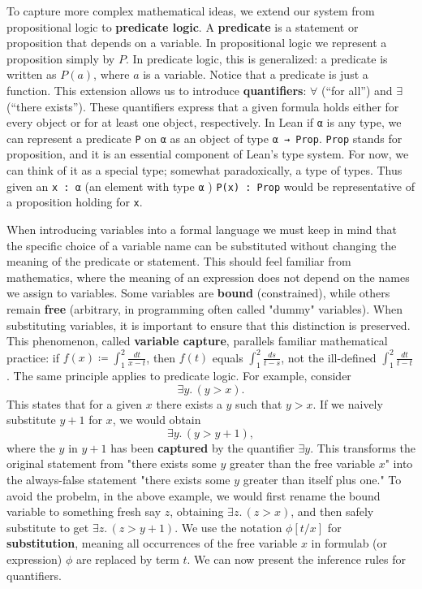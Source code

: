 To capture more complex mathematical ideas, we extend our system from 
propositional logic to \textbf{predicate logic}.  
A \textbf{predicate} is a statement or proposition that depends on a variable.
In propositional logic we represent a proposition simply by $P$.  
In predicate logic, this is generalized: a predicate is written as $P(a)$, 
where $a$ is a variable. Notice that a predicate is just a function.
This extension allows us to introduce \textbf{quantifiers}:  
$\forall$ (``for all'') and $\exists$ (``there exists'').  
These quantifiers express that a given formula holds either for every object 
or for at least one object, respectively.
In Lean if \lstinline[language=lean]|α| is any type, we can represent a 
predicate \lstinline[language=lean]|P| on \lstinline[language=lean]|α| as 
an object of type \lstinline[language=lean]|α → Prop|.
\lstinline[language=lean]|Prop| stands for proposition, and it is an 
essential component of Lean’s type system.
For now, we can think of it as a special type; somewhat 
paradoxically, a type of types. 
Thus given an \lstinline[language=lean]|x : α| (an element
with type \lstinline[language=lean]|α| ) 
\lstinline[language=lean]|P(x) : Prop| would be representative of a proposition holding for \lstinline[language=lean]|x|.

When introducing variables into a formal language we must keep in mind that the specific choice 
of a variable name can be substituted without 
changing the meaning of the predicate or statement. This should feel familiar from mathematics, 
where the meaning of an expression does not depend on the names we assign to variables.
Some variables are \textbf{bound} (constrained), while others remain \textbf{free} 
(arbitrary, in programming often called "dummy" variables). 
When substituting variables, it is important to ensure that this distinction is preserved.
This phenomenon, called \textbf{variable capture}, parallels familiar mathematical practice: 
if $f(x) \coloneqq \int_1^2 \frac{dt}{x-t}$, then $f(t)$ equals $\int_1^2 \frac{ds}{t-s}$, 
not the ill-defined $\int_1^2 \frac{dt}{t-t}$. The same principle applies to predicate logic. For example, consider
\[
\exists y.\,(y > x).
\]
This states that for a given $x$ there exists a $y$ such that $y > x$. 
If we naively substitute $y+1$ for $x$, we would obtain
\[
\exists y.\,(y > y+1),
\]
where the $y$ in $y+1$ has been \textbf{captured} by the quantifier $\exists y$. 
This transforms the original statement from "there exists some $y$ greater than the free variable $x$" into the always-false statement 
"there exists some $y$ greater than itself plus one."
To avoid the probelm, in the above example, we would first rename the bound variable to something fresh 
say $z$, obtaining $\exists z.\,(z > x)$, and then safely substitute to get $\exists z.\,(z > y+1)$.
We use the notation $\phi[t/x]$ for \textbf{substitution}, meaning all occurrences of the free 
variable $x$ in formulab (or expression) $\phi$ are replaced by term $t$.
We can now present the inference rules for quantifiers.
